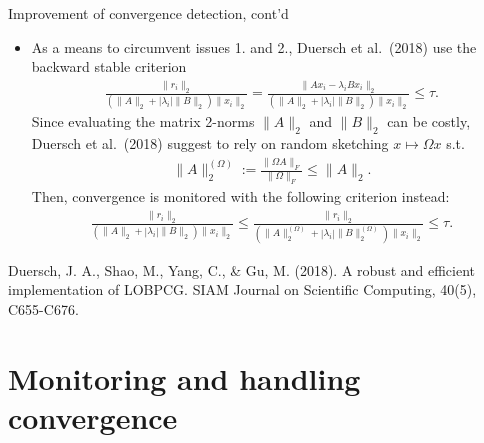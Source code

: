 \documentclass[t,usepdftitle=false]{beamer}
\begin{document}
\begin{frame}{Improvement of convergence detection, cont'd}
	\begin{itemize}
	\item As a means to circumvent issues 1. and 2., Duersch et al.~(2018) use the backward stable criterion
	\begin{align*}
	\frac{\|r_i\|_2}{(\|A\|_2+|\lambda_i|\|B\|_2)\|x_i\|_2}=\frac{\|Ax_i-\lambda_iBx_i\|_2}{(\|A\|_2+|\lambda_i|\|B\|_2)\|x_i\|_2}\leq\tau.
	\end{align*}
	Since evaluating the matrix 2-norms $\|A\|_2$ and $\|B\|_2$ can be costly, Duersch et al.~(2018) suggest to rely on random sketching $x\mapsto\Omega x$ s.t.
	\begin{align*}
	\|A\|_2^{(\Omega)}:=
	\frac{\|\Omega A\|_F}{\|\Omega\|_F}\leq\|A\|_2.
	\end{align*}
	Then, convergence is monitored with the following criterion instead:
	\begin{align*}
	\frac{\|r_i\|_2}{(\|A\|_2+|\lambda_i|\|B\|_2)\|x_i\|_2}
	\leq
	\frac{\|r_i\|_2}{(\|A\|_2^{(\Omega)}+|\lambda_i|\|B\|_2^{(\Omega)})\|x_i\|_2}\leq\tau.
	\end{align*}
	\end{itemize}
	\smallskip
	\tiny{Duersch, J. A., Shao, M., Yang, C., \& Gu, M. (2018). A robust and efficient implementation of LOBPCG. SIAM Journal on Scientific Computing, 40(5), C655-C676.}
\end{frame}

\section{Monitoring and handling convergence}
\end{document}
